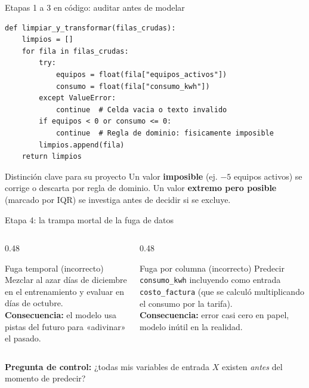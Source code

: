 \documentclass[aspectratio=169,11pt]{beamer}
\begin{document}
\begin{frame}[fragile]{Etapas 1 a 3 en código: auditar antes de modelar}
  \begin{lstlisting}[style=codigo]
def limpiar_y_transformar(filas_crudas):
    limpios = []
    for fila in filas_crudas:
        try:
            equipos = float(fila["equipos_activos"])
            consumo = float(fila["consumo_kwh"])
        except ValueError:
            continue  # Celda vacia o texto invalido
        if equipos < 0 or consumo <= 0:
            continue  # Regla de dominio: fisicamente imposible
        limpios.append(fila)
    return limpios
  \end{lstlisting}
  \begin{block}{Distinción clave para su proyecto}
    Un valor \textbf{imposible} (ej. $-5$ equipos activos) se corrige o descarta por regla de dominio. Un valor \textbf{extremo pero posible} (marcado por IQR) se investiga antes de decidir si se excluye.
  \end{block}
\end{frame}

\begin{frame}{Etapa 4: la trampa mortal de la fuga de datos}
  \begin{columns}[T]
    \begin{column}{0.48\textwidth}
      \begin{block}{Fuga temporal (incorrecto)}
        \small
        Mezclar al azar días de diciembre en el entrenamiento y evaluar en días de octubre.\\
        \vspace{0.15cm}
        \textbf{Consecuencia:} el modelo usa pistas del futuro para «adivinar» el pasado.
      \end{block}
    \end{column}
    \begin{column}{0.48\textwidth}
      \begin{block}{Fuga por columna (incorrecto)}
        \small
        Predecir \texttt{consumo\_kwh} incluyendo como entrada \texttt{costo\_factura} (que se calculó multiplicando el consumo por la tarifa).\\
        \vspace{0.15cm}
        \textbf{Consecuencia:} error casi cero en papel, modelo inútil en la realidad.
      \end{block}
    \end{column}
  \end{columns}
  \vfill
  \centering
  \textbf{Pregunta de control:} ¿todas mis variables de entrada $X$ existen \emph{antes} del momento de predecir?
\end{frame}
\end{document}
